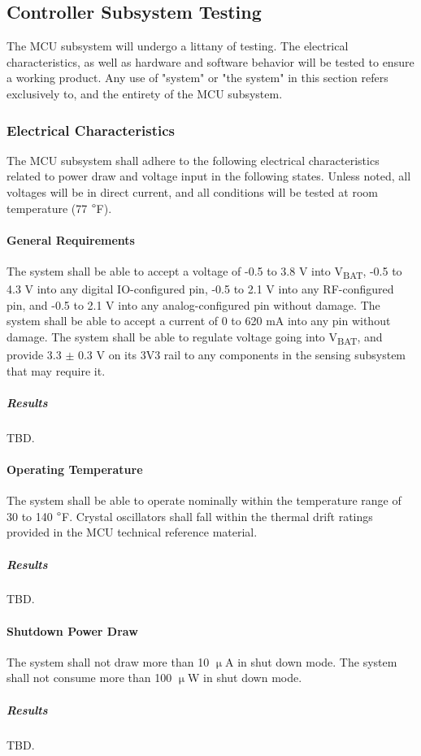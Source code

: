 \subsection{Controller Subsystem Testing}
\label{sec:controller_subsystem_testing}
The MCU subsystem will undergo a littany of testing. The electrical
characteristics, as well as hardware and software behavior will be tested to
ensure a working product. Any use of "system" or "the system" in this section refers exclusively to, and the entirety of the MCU subsystem.

\subsubsection{Electrical Characteristics}
The MCU subsystem shall adhere to the following electrical characteristics
related to power draw and voltage input in the following states. Unless noted,
all voltages will be in direct current, and all conditions will be tested at
room temperature (77 $\degree$F). 

\paragraph{General Requirements} The system shall be able to accept a voltage
of -0.5 to 3.8 V into V\textsubscript{BAT}, -0.5 to 4.3 V into any digital
IO-configured pin, -0.5 to 2.1 V into any RF-configured pin, and -0.5 to 2.1 V
into any analog-configured pin without damage. The system shall be able to
accept a current of 0 to 620 mA into any pin without damage. The system shall
be able to regulate voltage going into V\textsubscript{BAT}, and provide 3.3 $\pm$ 0.3 V
on its 3V3 rail to any components in the sensing
subsystem that may require it.
\subparagraph{Results} TBD.

\paragraph{Operating Temperature} The system shall be able to operate
nominally within the temperature range of 30 to 140 $\degree$F. Crystal
oscillators shall fall within the thermal drift ratings provided in the
MCU technical reference material.
\subparagraph{Results} TBD.

\paragraph{Shutdown Power Draw} The system shall not draw more than 10
$\upmu$A in shut down mode. The system shall not consume more than 100
$\upmu$W in shut down mode.
\subparagraph{Results} TBD.

